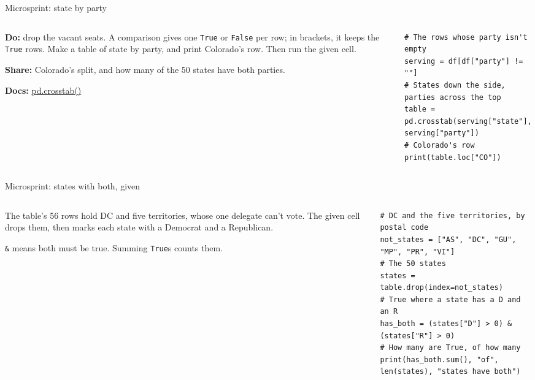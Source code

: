 \documentclass[9pt,aspectratio=169]{beamer}
\begin{document}
\begin{frame}[fragile]{Microsprint: state by party}
    \begin{columns}[T]
        \begin{column}{0.37\textwidth}
            \textbf{Do:} drop the vacant seats. A comparison gives one \texttt{True} or \texttt{False} per row; in brackets, it keeps the \texttt{True} rows. Make a table of state by party, and print Colorado's row. Then run the given cell.

            \medskip
            \textbf{Share:} Colorado's split, and how many of the 50 states have both parties.

            \medskip
            {\scriptsize\textbf{Docs:} \href{https://pandas.pydata.org/docs/reference/api/pandas.crosstab.html}{pd.crosstab()}\par}
        \end{column}
        \begin{column}{0.6\textwidth}
\begin{lstlisting}
# The rows whose party isn't empty
serving = df[df["party"] != ""]
# States down the side, parties across the top
table = pd.crosstab(serving["state"], serving["party"])
# Colorado's row
print(table.loc["CO"])
\end{lstlisting}
        \end{column}
    \end{columns}
\end{frame}

\begin{frame}[fragile]{Microsprint: states with both, given}
    \begin{columns}[T]
        \begin{column}{0.37\textwidth}
            The table's 56 rows hold DC and five territories, whose one delegate can't vote. The given cell drops them, then marks each state with a Democrat and a Republican.

            \medskip
            \texttt{\&} means both must be true. Summing \texttt{True}s counts them.
        \end{column}
        \begin{column}{0.6\textwidth}
\begin{lstlisting}
# DC and the five territories, by postal code
not_states = ["AS", "DC", "GU", "MP", "PR", "VI"]
# The 50 states
states = table.drop(index=not_states)
# True where a state has a D and an R
has_both = (states["D"] > 0) & (states["R"] > 0)
# How many are True, of how many
print(has_both.sum(), "of", len(states), "states have both")
\end{lstlisting}
        \end{column}
    \end{columns}
\end{frame}
\end{document}
